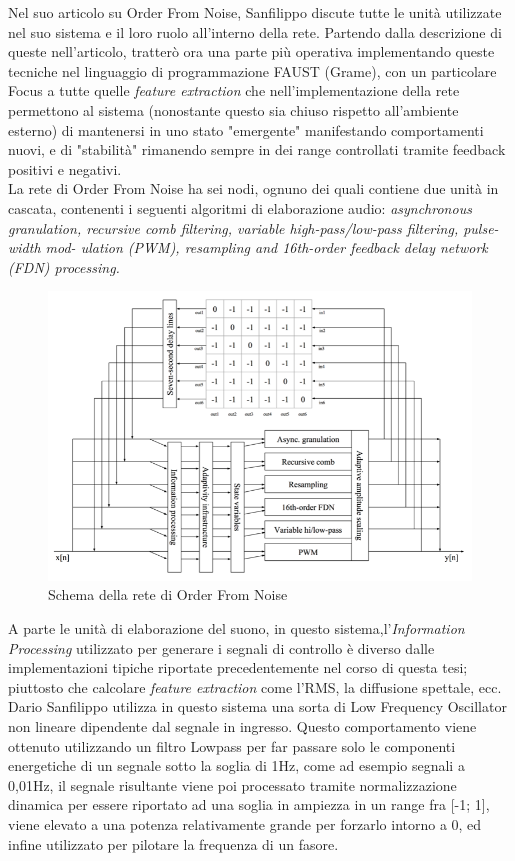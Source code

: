 Nel suo articolo su Order From Noise, Sanfilippo discute tutte le unità utilizzate
nel suo sistema e il loro ruolo all'interno della rete.
Partendo dalla descrizione di queste nell'articolo, tratterò ora una parte più operativa 
implementando queste tecniche nel linguaggio di programmazione FAUST (Grame), 
con un particolare Focus a tutte quelle \textit{feature extraction}
che nell'implementazione della rete permettono al sistema 
(nonostante questo sia chiuso rispetto all'ambiente esterno) 
di mantenersi in uno stato "emergente" manifestando comportamenti nuovi,
e di "stabilità" rimanendo sempre in dei range controllati tramite feedback positivi e negativi.\\
La rete di Order From Noise ha sei nodi, ognuno dei quali contiene due unità in cascata, 
contenenti i seguenti algoritmi di elaborazione audio: 
\textit{asynchronous granulation, recursive comb filtering, variable high-pass/low-pass filtering, pulse-width mod-
ulation (PWM), resampling and 16th-order feedback delay network (FDN) processing.}

\begin{figure}[h!]
\begin{center}
    \includegraphics[width=14cm]{figures/OFNnetwork.pdf}
    \caption{Schema della rete di Order From Noise}
    \end{center}
\end{figure}

A parte le unità di elaborazione del suono,
in questo sistema,l'\textit{Information Processing} utilizzato per generare i 
segnali di controllo è diverso
dalle implementazioni tipiche riportate precedentemente nel corso di questa tesi;
piuttosto che calcolare \textit{feature extraction} come l'RMS, la diffusione spettale, ecc. 
Dario Sanfilippo utilizza in questo sistema una sorta di Low Frequency Oscillator
non lineare dipendente dal segnale in ingresso.
Questo comportamento viene ottenuto utilizzando un filtro Lowpass per far 
passare solo le componenti energetiche di un segnale sotto la soglia di 1Hz,
come ad esempio segnali a 0,01Hz, il segnale risultante viene poi processato
tramite normalizzazione dinamica per essere riportato ad una soglia in ampiezza
in un range fra [-1; 1],
viene elevato a una potenza relativamente grande per forzarlo intorno a 0,
ed infine utilizzato per pilotare la frequenza di un fasore.\\

